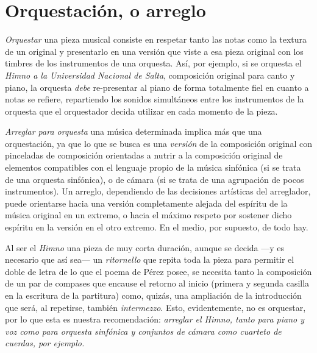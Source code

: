 \section{Orquestación, o arreglo}
\label{sec:orquestacion-arreglo}

\emph{Orquestar} una pieza musical consiste en respetar tanto las notas como la textura de un original y presentarlo en una versión que viste a esa pieza original con los timbres de los instrumentos de una orquesta. Así, por ejemplo, si se orquesta el \emph{Himno a la Universidad Nacional de Salta}, composición original para canto y piano, la orquesta \emph{debe} re-presentar al piano de forma totalmente fiel en cuanto a notas se refiere, repartiendo los sonidos simultáneos entre los instrumentos de la orquesta que el orquestador decida utilizar en cada momento de la pieza.

\emph{Arreglar para orquesta} una música determinada implica más que una orquestación, ya que lo que se busca es una \emph{versión} de la composición original con pinceladas de composición orientadas a nutrir a la composición original de elementos compatibles con el lenguaje propio de la música sinfónica (si se trata de una orquesta sinfónica), o de cámara (si se trata de una agrupación de pocos instrumentos). Un arreglo, dependiendo de las decisiones artísticas del arreglador, puede orientarse hacia una versión completamente alejada del espíritu de la música original en un extremo, o hacia el máximo respeto por sostener dicho espíritu en la versión en el otro extremo. En el medio, por supuesto, de todo hay.

Al ser el \emph{Himno} una pieza de muy corta duración, aunque se decida ---y es necesario que así sea--- un \emph{ritornello} que repita toda la pieza para permitir el doble de letra de lo que el poema de Pérez posee, se necesita tanto la composición de un par de compases que encause el retorno al inicio (primera y segunda casilla en la escritura de la partitura) como, quizás, una ampliación de la introducción que será, al repetirse, también \emph{intermezzo}. Esto, evidentemente, no es orquestar, por lo que esta es nuestra recomendación: \emph{arreglar el \emph{Himno}, tanto para piano y voz como para orquesta sinfónica y conjuntos de cámara como cuarteto de cuerdas, por ejemplo.}
